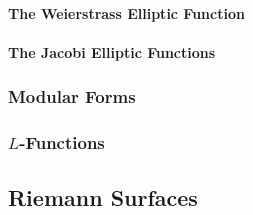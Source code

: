 



\paragraph{The Weierstrass Elliptic Function}





\paragraph{The Jacobi Elliptic Functions}






\subsubsection{Modular Forms}






\subsubsection{$L$-Functions}






\subsection{Riemann Surfaces}



